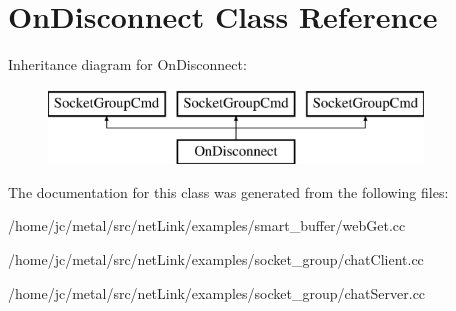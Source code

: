 \hypertarget{classOnDisconnect}{}\section{On\+Disconnect Class Reference}
\label{classOnDisconnect}
Inheritance diagram for On\+Disconnect\+:\begin{figure}[H]
\begin{center}
\leavevmode
\includegraphics[height=2.000000cm]{classOnDisconnect}
\end{center}
\end{figure}


The documentation for this class was generated from the following files\+:\begin{DoxyCompactItemize}
\item 
/home/jc/metal/src/net\+Link/examples/smart\+\_\+buffer/web\+Get.\+cc\item 
/home/jc/metal/src/net\+Link/examples/socket\+\_\+group/chat\+Client.\+cc\item 
/home/jc/metal/src/net\+Link/examples/socket\+\_\+group/chat\+Server.\+cc\end{DoxyCompactItemize}
